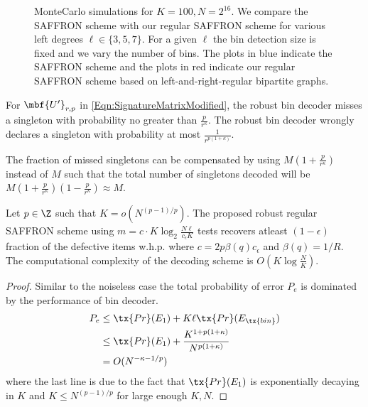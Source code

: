 \documentclass[conference,twocolumn]{IEEEtran}
\newcommand*{\FigPath}{../Figures}
\def\ceps{c_{\epsilon}}
\begin{document}
{%

\begin{figure}[t!]
\centering
\resizebox{\columnwidth}{!}{}
\caption{MonteCarlo simulations for $K=100, N=2^{16}$. We compare the SAFFRON scheme with our regular SAFFRON scheme for various left degrees $\ell\in\{3,5,7\}$. For a given $\ell$ the bin detection size is fixed and we vary the number of bins. The plots in blue indicate the SAFFRON scheme and the plots in red indicate our regular SAFFRON scheme based on left-and-right-regular bipartite graphs.}
\label{Fig:SimulationNoiseless}
\end{figure}

\begin{lemma}
For $\mbf{U'}_{r,p}$ in \eqref{Eqn:SignatureMatrixModified}, the robust bin decoder misses a singleton with probability no greater than $\frac{p}{r^{\kappa}}$. The robust bin decoder wrongly declares a singleton with probability at most $\frac{1}{r^{p(1+\kappa)}}$.
\end{lemma}
The fraction of missed singletons can be compensated by using $M(1+\frac{p}{r^{\kappa}})$ instead of $M$ such that the total number of singletons decoded will be $M(1+\frac{p}{r^{\kappa}})(1-\frac{p}{r^{\kappa}})\approx M$.

\begin{theorem}
Let $p\in\Z$ such that $K=o\left(N^{(p-1)/p}\right)$. The proposed robust regular SAFFRON scheme using $m=c\cdot K \log_{2}\frac{N\ell}{\ceps K}$ tests recovers atleast $(1-\epsilon)$ fraction of the defective items w.h.p. where $c=2p\beta(q)\ceps$ and $\beta(q)=1/R$. The computational complexity of the decoding scheme is $O(K\log \frac{N}{K})$.
\end{theorem}
\begin{proof}
Similar to the noiseless case the total probability of error $P_e$ is dominated by the performance of bin decoder.
\begin{align*}
P_e &\leq  \tx{Pr}(E_1)+ K\ell \tx{ Pr}(E_{\tx{bin}})\\
               &\leq \tx{Pr}(E_1)+ \frac{K^{1+p(1+\kappa)}}{N^{p(1+\kappa)}}\\
               &=O(N^{-\kappa-1/p})
\end{align*}
where the last line is due to the fact that $\tx{Pr}(E_1)$ is exponentially decaying in $K$ and $K\leq N^{(p-1)/p}$ for large enough $K,N$.
\end{proof}

}
\end{document}
